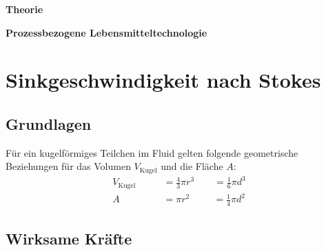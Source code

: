\documentclass[a4paper,11pt]{article}
\begin{document}

\begin{center}
\LARGE
\color{white}
\textbf{Theorie} \par \vspace*{2mm}
\large \color{miugray} \textbf{Prozessbezogene Lebensmitteltechnologie}
\end{center}
\par 
\vspace*{4mm}


\color{miudiutex}

\section*{Sinkgeschwindigkeit nach Stokes}
\subsection*{Grundlagen}
Für ein kugelförmiges Teilchen im Fluid gelten folgende geometrische Beziehungen für das Volumen $V_{\text{Kugel}}$ und die Fläche $A$:
\begin{align*}
    V_{\text{Kugel}} \qquad &= \frac{4}{3}\pi r^3 \qquad = \frac{1}{6}\pi d^3 \\
    A \qquad &= \pi r^2 \qquad ~~  = \frac{1}{4}\pi d^2
\end{align*}

\subsection*{Wirksame Kräfte}
\end{document}
